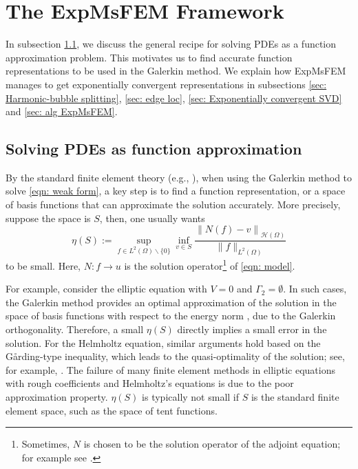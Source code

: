 \documentclass[12pt]{caltech_thesis}
\numberwithin{equation}{section}
\begin{document}
\section{The ExpMsFEM Framework}
\label{sec: The ExpMsFEM Framework}
In subsection \ref{sec: Solving PDEs as function approximation}, we discuss the general recipe for solving PDEs as a function approximation problem. This motivates us to find accurate function representations to be used in the Galerkin method. We explain how ExpMsFEM manages to get exponentially convergent representations in subsections \ref{sec: Harmonic-bubble splitting}, \ref{sec: edge loc}, \ref{sec: Exponentially convergent SVD} and \ref{sec: alg ExpMsFEM}.
\subsection{Solving PDEs as function approximation}
\label{sec: Solving PDEs as function approximation}
By the standard finite element theory (e.g., \cite{brenner2008mathematical}), when using the Galerkin method to solve \eqref{eqn: weak form}, a key step is to find a function representation, or a space of basis functions that can approximate the solution accurately. More precisely, suppose the space is $S$, then, one usually wants
 \begin{equation}
    \label{apro proxy}
        {\eta(S)}:=\sup _{f \in L^{2}(\Omega) \backslash\{0\}} \inf _{v \in S} \frac{\left\|N(f)-v\right\|_{\mathcal{H}(\Omega)}}{\|f\|_{L^{2}(\Omega)}}
    \end{equation}
to be small. Here, $N: f \to u$ is the solution operator\footnote{Sometimes, $N$ is chosen to be the solution operator of the adjoint equation; for example see \cite{melenk2010convergence}.} of \eqref{eqn: model}.

For example, consider the elliptic equation with $V=0$ and $\Gamma_2=\emptyset$. In such cases, the Galerkin method provides an optimal approximation of the solution in the space of basis functions with respect to the energy norm \cite{brenner2008mathematical, chen2021exponential}, due to the Galerkin orthogonality. Therefore, a small $\eta(S)$ directly implies a small error in the solution. For the Helmholtz equation, similar arguments hold based on the G\aa rding-type inequality, which leads to the quasi-optimality of the solution; see, for example, \cite{melenk2010convergence, chen2023exponentially}. The failure of many finite element methods in elliptic equations with rough coefficients \cite{babuvska2000can} and Helmholtz's equations \cite{babuska1997pollution} is due to the poor approximation property. $\eta(S)$ is typically not small if $S$ is the standard finite element space, such as the space of tent functions.
\end{document}
